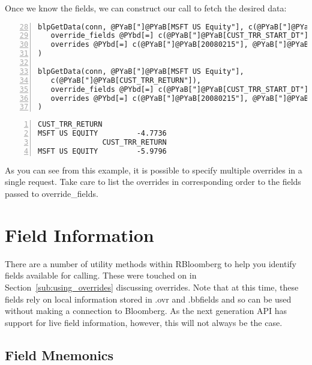 \documentclass[a4paper]{article}
\begin{document}
    

Once we know the fields, we can construct our call to fetch the desired data:

\begin{Verbatim}[commandchars=@\[\],numbers=left,firstnumber=28,stepnumber=1]
blpGetData(conn, @PYaB["]@PYaB[MSFT US Equity"], c(@PYaB["]@PYaB[CUST_TRR_RETURN"]),
   override_fields @PYbd[=] c(@PYaB["]@PYaB[CUST_TRR_START_DT"], @PYaB["]@PYaB[CUST_TRR_END_DT"]), 
   overrides @PYbd[=] c(@PYaB["]@PYaB[20080215"], @PYaB["]@PYaB[20080602"])
)

blpGetData(conn, @PYaB["]@PYaB[MSFT US Equity"], 
   c(@PYaB["]@PYaB[CUST_TRR_RETURN"]), 
   override_fields @PYbd[=] c(@PYaB["]@PYaB[CUST_TRR_START_DT"], @PYaB["]@PYaB[CUST_TRR_END_DT"], @PYaB["]@PYaB[CUST_TRR_CRNCY"]), 
   overrides @PYbd[=] c(@PYaB["]@PYaB[20080215"], @PYaB["]@PYaB[20080602"], @PYaB["]@PYaB[GBP"])
)
\end{Verbatim}

    

\begin{Verbatim}[commandchars=@\[\],numbers=left,firstnumber=1,stepnumber=1]
               CUST_TRR_RETURN
MSFT US EQUITY         -4.7736
               CUST_TRR_RETURN
MSFT US EQUITY         -5.9796
\end{Verbatim}

    

As you can see from this example, it is possible to specify multiple overrides in a single request. Take care to list the overrides in corresponding order to the fields passed to override\_fields.



\section{Field Information} %
\label{sec:field_information}

There are a number of utility methods within RBloomberg to help you identify fields available for calling. These were touched on in Section~\ref{sub:using_overrides} discussing overrides. Note that at this time, these fields rely on local information stored in .ovr and .bbfields and so can be used without making a connection to Bloomberg. As the next generation API has support for live field information, however, this will not always be the case.

\subsection{Field Mnemonics} %
\label{sub:field_mnemonics}
\end{document}
